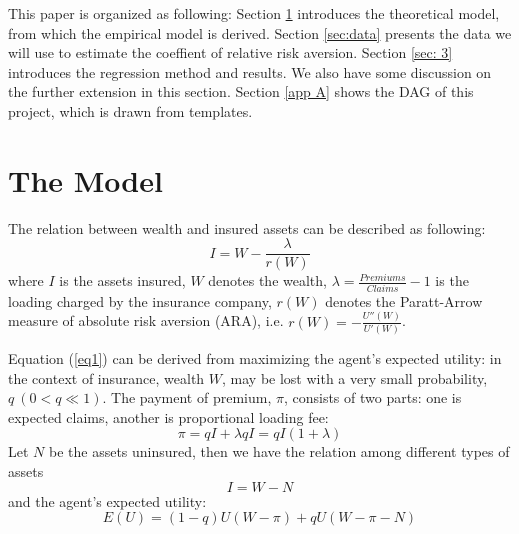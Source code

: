 \documentclass[11pt, a4paper, leqno]{article}
\begin{document}
This paper is organized as following: Section \ref{sec:model} introduces the theoretical model, from which the empirical model is derived. Section \ref{sec:data} presents the data we will use to estimate the coeffient of relative risk aversion. Section \ref{sec: 3} introduces the regression method and results. We also have some discussion on the further extension in this section. Section \ref{app A} shows the DAG of this project, which is drawn from \citet{GaudeckerEconProjectTemplates} templates.

\section{The Model}\label{sec:model}

The relation between wealth and insured assets can be described as following:
\begin{equation}\label{eq1}
I = W - \frac{\lambda}{r(W)}
\end{equation}
where $I$ is the assets insured, $W$ denotes the wealth, $\lambda = \frac{Premiums}{Claims} - 1$ is the loading charged by the insurance company, $r(W)$ denotes the Paratt-Arrow measure of absolute risk aversion (ARA), i.e. $r(W) = -\frac{U''(W)}{U'(W)}$.

Equation (\ref{eq1}) can be derived from maximizing the agent's expected utility: in the context of insurance, wealth $W$, may be lost with a very small probability, $q\ (0<q\ll1)$. The payment of premium, $\pi$, consists of two parts: one is expected claims, another is proportional loading fee:
\begin{equation}
\pi = qI + \lambda qI =qI(1 + \lambda)
\end{equation}
Let $N$ be the assets uninsured, then we have the relation among different types of assets
\begin{equation}\label{eq3}
I = W - N
\end{equation}
and the agent's expected utility:
\begin{equation}
E(U) = (1-q)U(W-\pi)+qU(W-\pi-N)
\end{equation}
\end{document}
